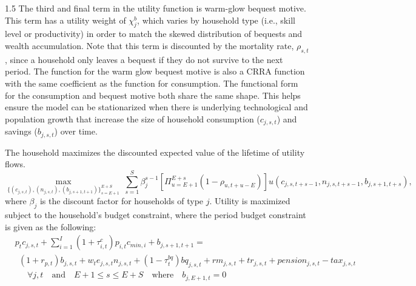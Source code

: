 \documentclass[letterpaper,12pt]{article}
\theoremstyle{definition}
\begin{document}
\begin{spacing}{1.5}
    The third and final term in the utility function is warm-glow bequest motive. This term has a utility weight of $\chi^b_j$, which varies by household type (i.e., skill level or productivity) in order to match the skewed distribution of bequests and wealth accumulation. Note that this term is discounted by the mortality rate, $\rho_{s,t}$, since a household only leaves a bequest if they do not survive to the next period. The function for the warm glow bequest motive is also a CRRA function with the same coefficient as the function for consumption. The functional form for the consumption and bequest motive both share the same shape. This helps ensure the model can be stationarized when there is underlying technological and population growth that increase the size of household consumption ($c_{j,s,t}$) and savings ($b_{j,s,t}$) over time.

    The household maximizes the discounted expected value of the lifetime of utility flows.
    \begin{equation}\label{EqHHmaxprob}
      \max_{\{(c_{j,s,t}),(n_{j,s,t}),(b_{j,s+1,t+1})\}_{s=E+1}^{E+S}}\: \sum_{s=1}^S\beta_j^{s-1}\left[\Pi_{u=E+1}^{E+s}(1 - \rho_{u,t+u-E})\right]u(c_{j,s,t+s-1},n_{j,s,t+s-1},b_{j,s+1,t+s}),
    \end{equation}
    where $\beta_j$ is the discount factor for households of type $j$.  Utility is maximized subject to the household's budget constraint, where the period budget constraint is given as the following:
    \begin{equation}\label{EqHHBC}
      \begin{split}
        &p_t c_{j,s,t} + \sum_{i=1}^I (1 + \tau^{c}_{i,t})p_{i,t}c_{min,i} + b_{j,s+1,t+1} = \\
        &\:\:(1 + r_{p,t})b_{j,s,t} + w_t e_{j,s,t} n_{j,s,t}  + (1-\tau^{bq}_t)bq_{j,s,t} + rm_{j,s,t} + tr_{j,s,t} + pension_{j,s,t} - tax_{j,s,t}  \\
        &\quad\:\:\forall j,t\quad\text{and}\quad E+1\leq s\leq E+S \quad\text{where}\quad b_{j,E+1,t}=0
      \end{split}
    \end{equation}


\end{spacing}
\end{document}
